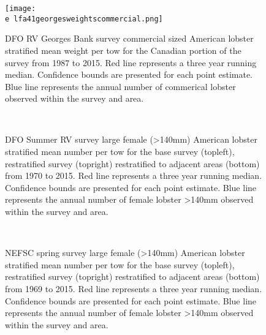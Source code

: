 \documentclass[11pt]{article}
\newcommand{\e}{/backup/bio_data/bio.lobster/figures/} %
\begin{document}
\begin{figure}

    \texttt{[image: \\e lfa41georgesweightscommercial.png]}
    \caption{DFO RV Georges Bank survey commercial sized American lobster stratified mean weight per tow for the Canadian portion of the survey from 1987 to 2015. Red line represents a three year running median. Confidence bounds are presented for each point estimate. Blue line represents the annual number of commerical lobster observed within the survey and area.}

\end{figure}



\begin{figure}
\centering
{}
\\
\caption{DFO Summer RV survey large female (\textgreater 140mm) American lobster stratified mean number per tow for the base survey (topleft), restratified survey (topright) restratified to adjacent areas (bottom) from 1970 to 2015. Red line represents a three year running median. Confidence bounds are presented for each point estimate. Blue line represents the annual number of female lobster \textgreater 140mm observed within the survey and area.}
\end{figure}
\clearpage

\begin{figure}
\centering
{}
\\
\caption{NEFSC spring survey large female (\textgreater 140mm) American lobster stratified mean number per tow for the base survey (topleft), restratified survey (topright) restratified to adjacent areas (bottom) from 1969 to 2015. Red line represents a three year running median. Confidence bounds are presented for each point estimate. Blue line represents the annual number of female lobster \textgreater 140mm observed within the survey and area.}
\end{figure}
\clearpage
\end{document}
